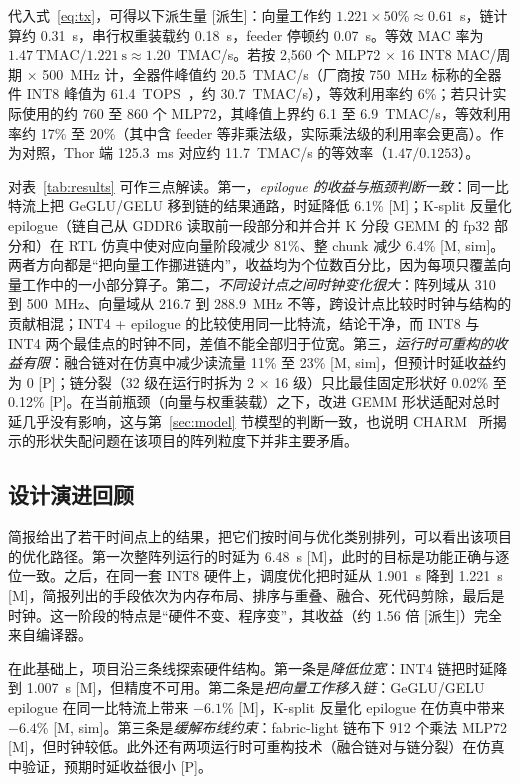\documentclass[a4paper,10.5pt]{ctexart}
\newcommand{\tM}{\textsf{[M]}}              %
\newcommand{\tP}{\textsf{[P]}}              %
\newcommand{\tMsim}{\textsf{[M, sim]}}      %
\newcommand{\tD}{\textsf{[派生]}}           %
\begin{document}
代入式~\eqref{eq:tx}，可得以下派生量 \tD：向量工作约 $1.221\times50\%\approx0.61$~s，链计算约 0.31~s，串行权重装载约 0.18~s，feeder 停顿约 0.07~s。等效 MAC 率为 $1.47~\text{TMAC}/1.221~\text{s}\approx1.20$~TMAC/s。若按 2,560 个 MLP72 $\times$ 16 INT8 MAC/周期 $\times$ 500~MHz 计，全器件峰值约 20.5~TMAC/s（厂商按 750~MHz 标称的全器件 INT8 峰值为 61.4~TOPS~\cite{achronix}，约 30.7~TMAC/s），等效利用率约 6\%；若只计实际使用的约 760 至 860 个 MLP72，其峰值上界约 6.1 至 6.9~TMAC/s，等效利用率约 17\% 至 20\%（其中含 feeder 等非乘法级，实际乘法级的利用率会更高）。作为对照，Thor 端 125.3~ms 对应约 11.7~TMAC/s 的等效率（$1.47/0.1253$）。

对表~\ref{tab:results} 可作三点解读。第一，\emph{epilogue 的收益与瓶颈判断一致}：同一比特流上把 GeGLU/GELU 移到链的结果通路，时延降低 6.1\% \tM；K-split 反量化 epilogue（链自己从 GDDR6 读取前一段部分和并合并 K 分段 GEMM 的 fp32 部分和）在 RTL 仿真中使对应向量阶段减少 81\%、整 chunk 减少 6.4\% \tMsim。两者方向都是“把向量工作挪进链内”，收益均为个位数百分比，因为每项只覆盖向量工作中的一小部分算子。第二，\emph{不同设计点之间时钟变化很大}：阵列域从 310 到 500~MHz、向量域从 216.7 到 288.9~MHz 不等，跨设计点比较时时钟与结构的贡献相混；INT4 + epilogue 的比较使用同一比特流，结论干净，而 INT8 与 INT4 两个最佳点的时钟不同，差值不能全部归于位宽。第三，\emph{运行时可重构的收益有限}：融合链对在仿真中减少读流量 11\% 至 23\% \tMsim，但预计时延收益约为 0 \tP；链分裂（32 级在运行时拆为 2 $\times$ 16 级）只比最佳固定形状好 0.02\% 至 0.12\% \tP。在当前瓶颈（向量与权重装载）之下，改进 GEMM 形状适配对总时延几乎没有影响，这与第~\ref{sec:model} 节模型的判断一致，也说明 CHARM~\cite{charm} 所揭示的形状失配问题在该项目的阵列粒度下并非主要矛盾。

\subsection{设计演进回顾}\label{sec:evolution}

简报给出了若干时间点上的结果，把它们按时间与优化类别排列，可以看出该项目的优化路径。第一次整阵列运行的时延为 6.48~s \tM，此时的目标是功能正确与逐位一致。之后，在同一套 INT8 硬件上，调度优化把时延从 1.901~s 降到 1.221~s \tM，简报列出的手段依次为内存布局、排序与重叠、融合、死代码剪除，最后是时钟。这一阶段的特点是“硬件不变、程序变”，其收益（约 1.56 倍 \tD）完全来自编译器。

在此基础上，项目沿三条线探索硬件结构。第一条是\emph{降低位宽}：INT4 链把时延降到 1.007~s \tM，但精度不可用。第二条是\emph{把向量工作移入链}：GeGLU/GELU epilogue 在同一比特流上带来 $-6.1\%$ \tM，K-split 反量化 epilogue 在仿真中带来 $-6.4\%$ \tMsim。第三条是\emph{缓解布线约束}：fabric-light 链布下 912 个乘法 MLP72 \tM，但时钟较低。此外还有两项运行时可重构技术（融合链对与链分裂）在仿真中验证，预期时延收益很小 \tP。
\end{document}
